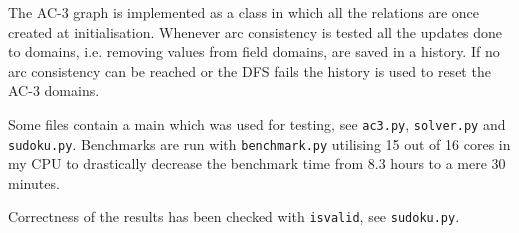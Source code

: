 \documentclass[a4paper]{article}
\begin{document}
The AC-3 graph is implemented as a class in which all the relations are once
created at initialisation. Whenever arc consistency is tested all the updates
done to domains, i.e. removing values from field domains, are saved in a
history. If no arc consistency can be reached or the DFS fails the history is
used to reset the AC-3 domains.

Some files contain a main which was used for testing, see \texttt{ac3.py},
\texttt{solver.py} and \texttt{sudoku.py}. Benchmarks are run with
\texttt{benchmark.py} utilising 15 out of 16 cores in my CPU to drastically
decrease the benchmark time from 8.3 hours to a mere 30 minutes.

Correctness of the results has been checked with \texttt{isvalid}, see
\texttt{sudoku.py}.
\end{document}
